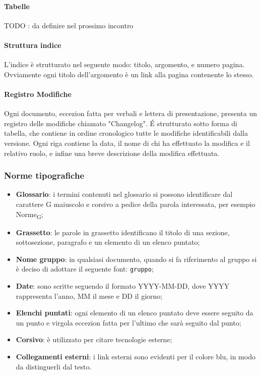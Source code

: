 \paragraph{Tabelle\\}
TODO : da definire nel prossimo incontro

\paragraph{Struttura indice\\}
L'indice è strutturato nel seguente modo: titolo, argomento, e numero pagina. Ovviamente ogni titolo dell'argomento è un link alla pagina contenente lo stesso.

\paragraph{Registro Modifiche\\}
Ogni documento, eccezion fatta per verbali e lettera di presentazione, presenta un registro delle modifiche chiamato "Changelog". \'E strutturato sotto forma di tabella, che contiene in ordine cronologico tutte le modifiche identificabili dalla versione.  Ogni riga contiene la data, il nome di chi ha effettuato la modifica e il relativo ruolo, e infine una breve descrizione della modifica effettuata.

\subsubsection{Norme tipografiche}
\begin{itemize}
	\item \textbf{Glossario}: i termini contenuti nel glossario si possono identificare dal carattere G maiuscolo e corsivo a pedice della parola interessata, per esempio Norme\textsubscript{G};
	\item \textbf{Grassetto}: le parole in grassetto identificano il titolo di una sezione, sottosezione, paragrafo e un elemento di un elenco puntato;
	\item \textbf{Nome gruppo}: in qualsiasi documento, quando si fa riferimento al gruppo si è deciso di adottare il seguente font: \texttt{gruppo};
	\item \textbf{Date}: sono scritte seguendo il formato YYYY-MM-DD, dove YYYY rappresenta l'anno, MM il mese e DD il giorno;
	\item \textbf{Elenchi puntati}: ogni elemento di un elenco puntato deve essere seguito da un punto e virgola eccezion fatta per l'ultimo che sarà seguito dal punto;
	\item \textbf{Corsivo}: è utilizzato per citare tecnologie esterne;
	\item \textbf{Collegamenti esterni}: i link esterni sono evidenti per il colore blu, in modo da distinguerli dal testo.
\end{itemize}


